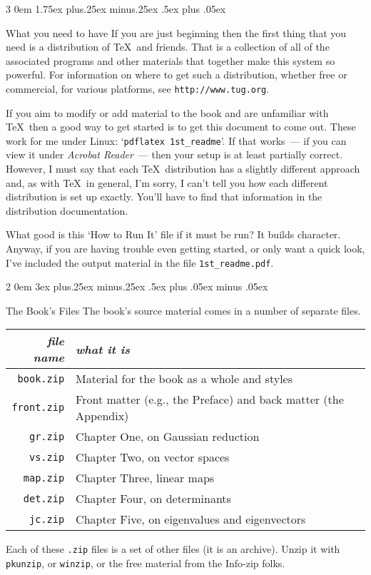 \documentclass[titlepage]{article}
\makeatletter
\renewcommand{\subsection}{\@startsection{subsection}%
  {2}%
  {0em}%
  {3ex plus.25ex minus.25ex}%
  {.5ex plus .05ex minus .05ex}%
  {\large\bfseries\raggedright}}
\renewcommand{\subsubsection}{\@startsection{subsubsection}%
  {3}%
  {0em}%
  {1.75ex plus.25ex minus.25ex}%
  {.5ex plus .05ex}%
  {\bfseries\raggedright}}
\makeatother
\begin{document}
\subsubsection{What you need to have}
If you are just beginning then the first thing that you need is a
distribution of \TeX\ and friends. 
That is a collection of all of the 
associated programs and other materials that together
make this system so powerful.
For information on where to get such a distribution, 
whether free or commercial, for various platforms,
see \texttt{http://www.tug.org}.

If you aim to modify or add material to
the book and are unfamiliar with \TeX\ then 
a good way to get started is to get this document to come out.  
These work for me under Linux:
`\verb!pdflatex 1st_readme!'. 
If that works~--- if you can view it under \textit{Acrobat Reader}~--- then 
your setup is at least partially correct. 
However, I must say that each \TeX\ distribution 
has a slightly different approach and,
as with \TeX\ in general, I'm sorry, I can't tell you how each different
distribution is set up exactly.
You'll have to find that information in the distribution
documentation.

What good is this `How to Run It' file if it must be run?
It builds character.
Anyway, if you are having trouble even getting started, or only want a quick
look, I've included the output material in the file \texttt{1st\_readme.pdf}. 





\subsection{The Book's Files}
The book's source material comes in a number of separate files.
\begin{center}
  \begin{tabular}{r|l}
    \textit{file name}  &\textit{what it is}  \\
    \hline
    \texttt{book.zip}  &Material for the book as a whole and styles \\
    \texttt{front.zip} &Front matter (e.g., the Preface) 
                         and back matter (the Appendix)  \\
    \texttt{gr.zip}    &Chapter One, on Gaussian reduction \\
    \texttt{vs.zip}    &Chapter Two, on vector spaces \\
    \texttt{map.zip}   &Chapter Three, linear maps \\
    \texttt{det.zip}   &Chapter Four, on determinants \\
    \texttt{jc.zip}    &Chapter Five, on eigenvalues and eigenvectors \\
  \end{tabular}
\end{center}
Each of these \texttt{.zip} files is a set of other
files (it is an archive).
Unzip it with \texttt{pkunzip}, or \texttt{winzip}, or the free material
from the Info-zip folks.
\end{document}
